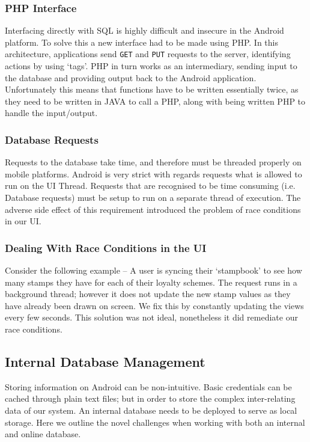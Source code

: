\subsubsection{PHP Interface}
Interfacing directly with SQL is highly difficult and insecure in the Android platform. To solve this a new interface had to be made using PHP. In this architecture, applications send \texttt{GET} and \texttt{PUT} requests to the server, identifying actions by using `tags'. PHP in turn works as an intermediary, sending input to the database and providing output back to the Android application. Unfortunately this means that functions have to be written essentially twice, as they need to be written in JAVA to call a PHP, along with being written PHP to handle the input/output.
\subsubsection{Database Requests}
Requests to the database take time, and therefore must be threaded properly on mobile platforms. Android is very strict with regards requests what is allowed to run on the UI Thread. Requests that are recognised to be time consuming (i.e. Database requests) must be setup to run on a separate thread of execution. The adverse side effect of this requirement introduced the problem of race conditions in our UI.
\subsubsection{Dealing With Race Conditions in the UI}
Consider the following example -- A user is syncing their `stampbook' to see how many stamps they have for each of their loyalty schemes. The request runs in a background thread; however it does not update the new stamp values as they have already been drawn on screen. We fix this by constantly updating the views every few seconds. This solution was not ideal, nonetheless it did remediate our race conditions.

\newpage

\subsection{Internal Database Management}
Storing information on Android can be non-intuitive. Basic credentials can be cached through plain text files; but in order to store the complex inter-relating data of our system. An internal database needs to be deployed to serve as local storage. Here we outline the novel challenges when working with both an internal and online database.
